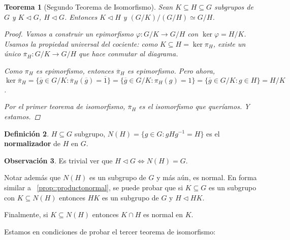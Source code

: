 \documentclass[12pt]{book}
\newtheorem{teo}{Teorema}[section]
\theoremstyle{definition}
\newtheorem{obs}[teo]{Observación}
\newtheorem{defn}[teo]{Definición}
\begin{document}
\begin{teo}[Segundo Teorema de Isomorfismo]
Sean $K\subseteq H\subseteq G$ subgrupos de $G$ y $K\triangleleft G$, $H\triangleleft G$. Entonces $K\triangleleft H$ y $(G/K)/(G/H)\simeq G/H$.
\begin{proof}
Vamos a construir un epimorfismo $\varphi:G/K\to G/H$ con $\ker \varphi = H/K$. Usamos la propiedad universal del cociente: como $K\subseteq H=\ker\pi_H$, existe un único $\overline{\pi}_H:G/K\to G/H$ que hace conmutar al diagrama. 
\begin{center}
\end{center}
Como $\pi_H$ es epimorfismo, entonces $\overline{\pi}_H$ es epimorfismo. Pero ahora, $\ker{\overline{\pi}_H}=\{\overline{g}\in G/K : \overline{\pi}_H(\overline{g}) = \overline{1}\} = \{\overline{g}\in G/K : \pi_H(g)=1\}=\{\overline{g}\in G/K : g\in H\} = H/K$.

Por el primer teorema de isomorfismo, $\overline{\pi}_H$ es el isomorfismo que queríamos. Y estamos.
\end{proof}
\end{teo}

\begin{defn}
$H\subseteq G$ subgrupo, $N(H) = \{g\in G : gHg^{-1} = H\}$ es el \textbf{normalizador} de $H$ en $G$.
\end{defn}
\begin{obs}
Es trivial ver que $H\triangleleft G \Longleftrightarrow N(H)=G$.

Notar además que $N(H)$ es un subgrupo de $G$ y más aún, es normal. En forma similar a ~\ref{prop::productonormal}, se puede probar que si $K\subseteq G$ es un subgrupo con $K\subseteq N(H)$ entonces $HK$ es un subgrupo de $G$ y $H\triangleleft HK$.

Finalmente, si $K\subseteq N(H)$ entonces $K\cap H$ es normal en $K$.

\end{obs}
Estamos en condiciones de probar el tercer teorema de isomorfismo:
\end{document}
